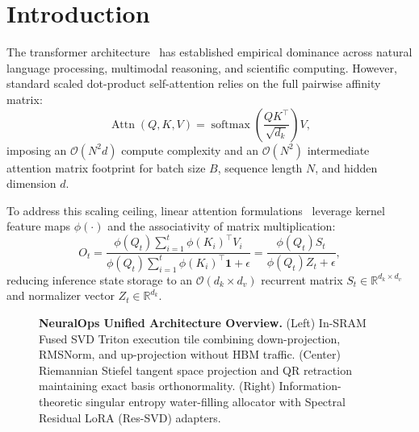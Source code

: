 \section{Introduction}
\label{sec:intro}

The transformer architecture~\cite{vaswani2017attention} has established empirical dominance across natural language processing, multimodal reasoning, and scientific computing. However, standard scaled dot-product self-attention relies on the full pairwise affinity matrix:
\begin{equation}
\operatorname{Attn}(Q, K, V) = \operatorname{softmax}\left(\frac{Q K^\top}{\sqrt{d_k}}\right) V,
\end{equation}
imposing an $\mathcal{O}(N^2 d)$ compute complexity and an $\mathcal{O}(N^2)$ intermediate attention matrix footprint for batch size $B$, sequence length $N$, and hidden dimension $d$.

To address this scaling ceiling, linear attention formulations~\cite{katharopoulos2020transformers,choromanski2020rethinking,schlag2021linear} leverage kernel feature maps $\phi(\cdot)$ and the associativity of matrix multiplication:
\begin{equation}
\label{eq:linear_assoc}
O_t = \frac{\phi(Q_t) \sum_{i=1}^t \phi(K_i)^\top V_i}{\phi(Q_t) \sum_{i=1}^t \phi(K_i)^\top \mathbf{1} + \epsilon} = \frac{\phi(Q_t) S_t}{\phi(Q_t) Z_t + \epsilon},
\end{equation}
reducing inference state storage to an $\mathcal{O}(d_k \times d_v)$ recurrent matrix $S_t \in \mathbb{R}^{d_k \times d_v}$ and normalizer vector $Z_t \in \mathbb{R}^{d_k}$.

\begin{figure}[t]
\centering
\caption{\textbf{NeuralOps Unified Architecture Overview.} (Left) In-SRAM Fused SVD Triton execution tile combining down-projection, RMSNorm, and up-projection without HBM traffic. (Center) Riemannian Stiefel tangent space projection and QR retraction maintaining exact basis orthonormality. (Right) Information-theoretic singular entropy water-filling allocator with Spectral Residual LoRA (Res-SVD) adapters.}
\label{fig:neuralops_overview}
\end{figure}

